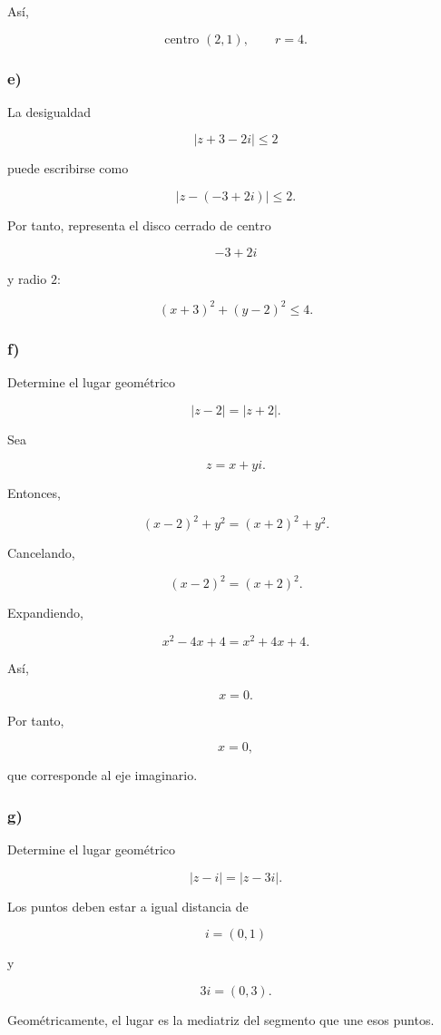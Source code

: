 \documentclass[12pt]{article}
\begin{document}
Así,

\[
\boxed{
\text{centro }(2,1),
\qquad
r=4
}.
\]

\subsubsection*{e)}

La desigualdad

\[
|z+3-2i|\leq2
\]

puede escribirse como

\[
|z-(-3+2i)|\leq2.
\]

Por tanto, representa el disco cerrado de centro

\[
-3+2i
\]

y radio \(2\):

\[
\boxed{
(x+3)^2+(y-2)^2\leq4
}.
\]

\subsubsection*{f)}

Determine el lugar geométrico

\[
|z-2|=|z+2|.
\]

Sea

\[
z=x+yi.
\]

Entonces,

\[
(x-2)^2+y^2
=
(x+2)^2+y^2.
\]

Cancelando,

\[
(x-2)^2=(x+2)^2.
\]

Expandiendo,

\[
x^2-4x+4
=
x^2+4x+4.
\]

Así,

\[
x=0.
\]

Por tanto,

\[
\boxed{x=0},
\]

que corresponde al eje imaginario.

\subsubsection*{g)}

Determine el lugar geométrico

\[
|z-i|=|z-3i|.
\]

Los puntos deben estar a igual distancia de

\[
i=(0,1)
\]

y

\[
3i=(0,3).
\]

Geométricamente, el lugar es la mediatriz del segmento que une esos
puntos.
\end{document}
